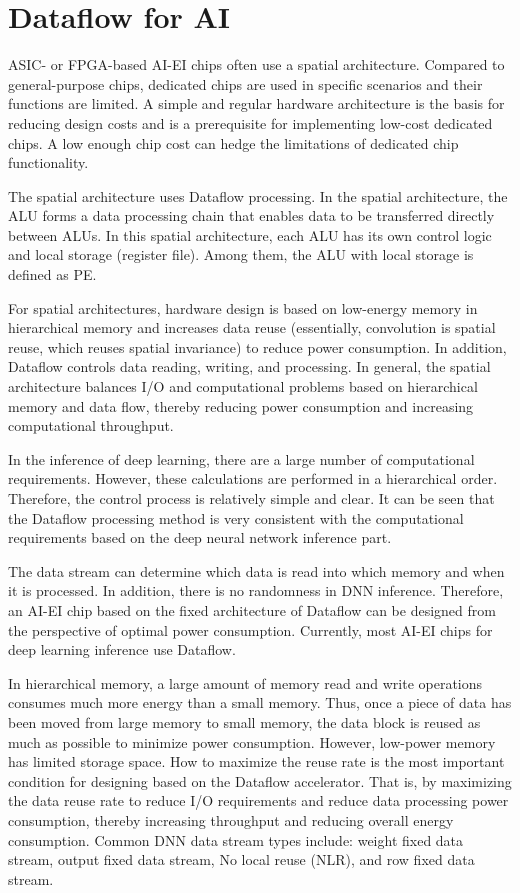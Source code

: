 \documentclass[UTF8,12pt,a4paper]{article}
\begin{document}
\clearpage

\section{Dataflow for AI}

ASIC- or FPGA-based AI-EI chips often use a spatial architecture.
Compared to general-purpose chips, dedicated chips are used
in specific scenarios and their functions are limited.
A simple and regular hardware architecture is the basis for reducing design costs
and is a prerequisite for implementing low-cost dedicated chips.
A low enough chip cost can hedge the limitations of dedicated chip functionality.

The spatial architecture uses Dataflow processing.
In the spatial architecture, the ALU forms a data processing chain
that enables data to be transferred directly between ALUs.
In this spatial architecture, each ALU has its own control logic and local storage (register file).
Among them, the ALU with local storage is defined as PE.

For spatial architectures, hardware design is based on
low-energy memory in hierarchical memory and increases data reuse
(essentially, convolution is spatial reuse, which reuses spatial invariance) to reduce power consumption.
In addition, Dataflow controls data reading, writing, and processing.
In general, the spatial architecture balances I/O and computational problems
based on hierarchical memory and data flow,
thereby reducing power consumption and increasing computational throughput.

In the inference of deep learning, there are a large number of computational requirements.
However, these calculations are performed in a hierarchical order.
Therefore, the control process is relatively simple and clear.
It can be seen that the Dataflow processing method is very consistent
with the computational requirements based on the deep neural network inference part.

The data stream can determine which data is read into which memory and when it is processed.
In addition, there is no randomness in DNN inference.
Therefore, an AI-EI chip based on the fixed architecture of Dataflow
can be designed from the perspective of optimal power consumption.
Currently, most AI-EI chips for deep learning inference use Dataflow.

In hierarchical memory, a large amount of memory read and write operations
consumes much more energy than a small memory.
Thus, once a piece of data has been moved from large memory to small memory,
the data block is reused as much as possible to minimize power consumption.
However, low-power memory has limited storage space.
How to maximize the reuse rate is the most important condition
for designing based on the Dataflow accelerator.
That is, by maximizing the data reuse rate to reduce I/O requirements
and reduce data processing power consumption,
thereby increasing throughput and reducing overall energy consumption.
Common DNN data stream types include: weight fixed data stream, output fixed data stream, No local reuse (NLR), and row fixed data stream.
\end{document}

